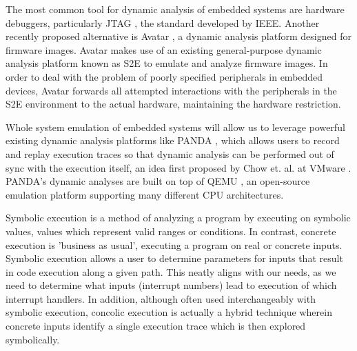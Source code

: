 \documentclass[letterpaper, 10 pt, conference]{ieeeconf}
\begin{document}
The most common tool for dynamic analysis of embedded systems are hardware debuggers, particularly JTAG \cite{jtag}, the standard developed by IEEE. Another recently proposed alternative is Avatar \cite{avatar}, a dynamic analysis platform designed for firmware images. Avatar makes use of an existing general-purpose dynamic analysis platform known as S2E \cite{s2e} to emulate and analyze firmware images. In order to deal with the problem of poorly specified peripherals in embedded devices, Avatar forwards all attempted interactions with the peripherals in the S2E environment to the actual hardware, maintaining the hardware restriction. 

Whole system emulation of embedded systems will allow us to leverage powerful existing dynamic analysis platforms like PANDA \cite{panda}, which allows users to record and replay execution traces so that dynamic analysis can be performed out of sync with the execution itself, an idea first proposed by Chow et. al. at VMware \cite{jchow}. PANDA's dynamic analyses are built on top of QEMU \cite{qemu}, an open-source emulation platform supporting many different CPU architectures. 

Symbolic execution \cite{jking} is a method of analyzing a program by executing on symbolic values, values which represent valid ranges or conditions. In contrast, concrete execution is 'business as usual', executing a program on real or concrete inputs. Symbolic execution allows a user to determine parameters for inputs that result in code execution along a given path. This neatly aligns with our needs, as we need to determine what inputs (interrupt numbers) lead to execution of which interrupt handlers. In addition, although often used interchangeably with symbolic execution, concolic execution \cite{ksen} is actually a hybrid technique wherein concrete inputs identify a single execution trace which is then explored symbolically. 
\end{document}
